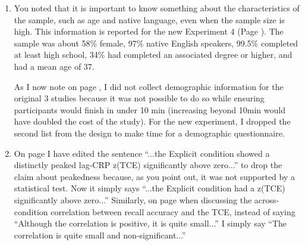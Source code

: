 \documentclass[12pt]{article}
\begin{document}
\begin{enumerate}
\item
	You noted that it is important to know something about the characteristics of the sample, such as age and native language, even when the sample size is high. This information is reported for the new Experiment 4 (Page \pageref{newexp}). The sample was about 58\% female, 97\% native English speakers, 99.5\% completed at least high school, 34\% had completed an associated degree or higher, and had a mean age of 37.

	As I now note on page \pageref{TODO-10}, I did not collect demographic information for the original 3 studies because it was not possible to do so while ensuring participants would finish in under 10 min (increasing beyond 10min would have doubled the cost of the study). For the new experiment, I dropped the second list from the design to make time for a demographic questionnaire. %

\item
	On page \pageref{done-11} I have edited the sentence ``...the Explicit condition showed a distinctly peaked lag-CRP z(TCE) significantly above zero...'' to drop the claim about peakedness because, as you point out, it was not supported by a statistical test. Now it simply says ``...the Explicit condition had a z(TCE) significantly above zero...''
	Similarly, on page \pageref{done-12} when discussing the across-condition correlation between recall accuracy and the TCE, instead of saying ``Although the correlation is positive, it is quite small...'' I simply say ``The correlation is quite small and non-significant...'' %


\end{enumerate}
\end{document}

